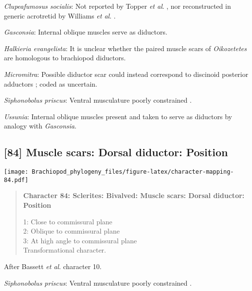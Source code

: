 \documentclass[openany]{book}
\theoremstyle{definition}
\theoremstyle{definition}
\theoremstyle{definition}
\theoremstyle{remark}
\begin{document}
\hypertarget{Clupeafumosus_socialis-coding-83}{}
\emph{Clupeafumosus socialis}: Not reported by Topper \emph{et al}.
\citeyearpar{Topper2013Reappraisalof}, nor reconstructed in generic
acrotretid by Williams \emph{et al}.
\citeyearpar{Williams2000LinguliformeaCraniiformea}.

\hypertarget{Gasconsia-coding-83}{}
\emph{Gasconsia}: Internal oblique muscles serve as diductors.

\hypertarget{Halkieria_evangelista-coding-83}{}
\emph{Halkieria evangelista}: It is unclear whether the paired muscle
scars of \emph{Oikozetetes} are homologous to brachiopod diductors.

\hypertarget{Micromitra-coding-83}{}
\emph{Micromitra}: Possible diductor scar could instead correspond to
discinoid posterior adductors \citep{Williams1998Thediversity}; coded as
uncertain.

\hypertarget{Siphonobolus_priscus-coding-83}{}
\emph{Siphonobolus priscus}: Ventral musculature poorly constrained
\citep{Williams2000LinguliformeaCraniiformea, Popov2009Earlyontogeny}.

\hypertarget{Ussunia-coding-83}{}
\emph{Ussunia}: Internal oblique muscles present \citep{Nikitin1984} and
taken to serve as diductors by analogy with \emph{Gasconsia}.

\subsection*{{[}84{]} Muscle scars: Dorsal diductor:
Position}\label{muscle-scars-dorsal-diductor-position}

\texttt{[image: Brachiopod\_phylogeny\_files/figure-latex/character-mapping-84.pdf]}

\begin{quote}
\textbf{Character 84: Sclerites: Bivalved: Muscle scars: Dorsal
diductor: Position}

1: Close to commissural plane\\
2: Oblique to commissural plane\\
3: At high angle to commissural plane\\
Transformational character.
\end{quote}

After Bassett \emph{et al}.
\citeyearpar{Bassett2001Functionalmorphology} character 10.

\hypertarget{Siphonobolus_priscus-coding-84}{}
\emph{Siphonobolus priscus}: Ventral musculature poorly constrained
\citep{Williams2000LinguliformeaCraniiformea, Popov2009Earlyontogeny}.
\end{document}
